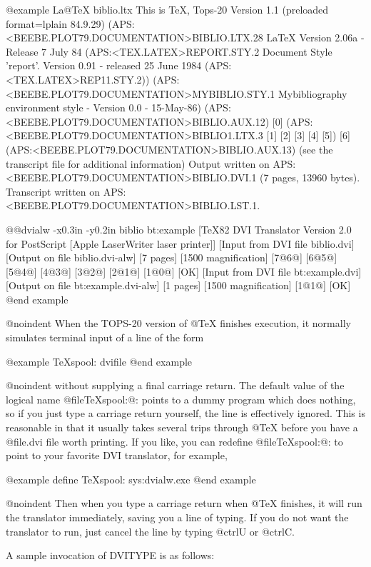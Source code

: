 {@example
La@TeX{} biblio.ltx
This is TeX, Tops-20 Version 1.1 (preloaded format=lplain 84.9.29)
(APS:<BEEBE.PLOT79.DOCUMENTATION>BIBLIO.LTX.28
LaTeX Version 2.06a - Release 7 July 84
(APS:<TEX.LATEX>REPORT.STY.2
Document Style 'report'. Version 0.91 - released 25 June 1984
(APS:<TEX.LATEX>REP11.STY.2))
(APS:<BEEBE.PLOT79.DOCUMENTATION>MYBIBLIO.STY.1 Mybibliography
environment style - Version 0.0 - 15-May-86)
(APS:<BEEBE.PLOT79.DOCUMENTATION>BIBLIO.AUX.12) [0]
(APS:<BEEBE.PLOT79.DOCUMENTATION>BIBLIO1.LTX.3 [1] [2] [3] [4]
[5]) [6]
(APS:<BEEBE.PLOT79.DOCUMENTATION>BIBLIO.AUX.13)
(see the transcript file for additional information)
Output written on APS:<BEEBE.PLOT79.DOCUMENTATION>BIBLIO.DVI.1
(7 pages, 13960 bytes).
Transcript written on APS:<BEEBE.PLOT79.DOCUMENTATION>BIBLIO.LST.1.

@@dvialw -x0.3in -y0.2in biblio bt:example
[TeX82 DVI Translator Version 2.0 for PostScript [Apple LaserWriter
laser printer]]
[Input from DVI file biblio.dvi]
[Output on file biblio.dvi-alw]
[7 pages]
[1500 magnification]
[7@{6@}] [6@{5@}] [5@{4@}] [4@{3@}] [3@{2@}] [2@{1@}] [1@{0@}]  [OK]
[Input from DVI file bt:example.dvi]
[Output on file bt:example.dvi-alw]
[1 pages]
[1500 magnification]
[1@{1@}]  [OK]
@end example

@noindent
When the TOPS-20 version of @TeX{} finishes execution, it
normally simulates terminal input of a line of the form

@example
TeXspool: dvifile
@end example

@noindent
without supplying a final carriage return.  The default value of
the logical name @file{TeXspool:}@: points to a dummy program which
does nothing, so if you just type a carriage return yourself, the
line is effectively ignored.  This is reasonable in that it
usually takes several trips through @TeX{} before you have a
@file{.dvi} file worth printing.  If you like, you can redefine
@file{TeXspool:}@: to point to your favorite DVI translator, for
example,

@example
define TeXspool: sys:dvialw.exe
@end example

@noindent
Then when you type a carriage return when @TeX{} finishes, it
will run the translator immediately, saving you a line of typing.
If you do not want the translator to run, just cancel the line by
typing @ctrl{U} or @ctrl{C}.

A sample invocation of DVITYPE is as follows:

}
